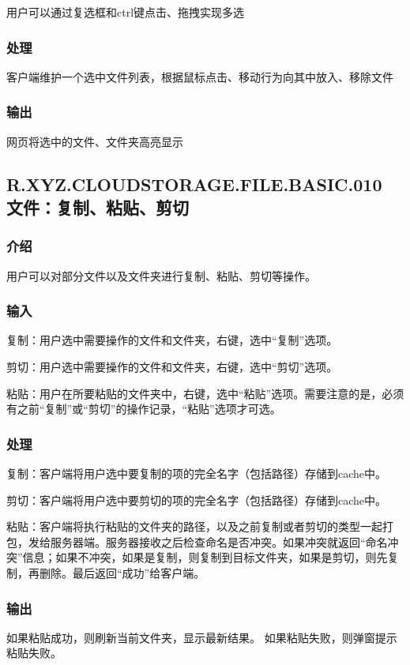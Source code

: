 用户可以通过复选框和ctrl键点击、拖拽实现多选

\subsubsection{处理}

客户端维护一个选中文件列表，根据鼠标点击、移动行为向其中放入、移除文件

\subsubsection{输出}

网页将选中的文件、文件夹高亮显示



\subsection{R.XYZ.CLOUDSTORAGE.FILE.BASIC.010 文件：复制、粘贴、剪切}

\subsubsection{介绍} 
用户可以对部分文件以及文件夹进行复制、粘贴、剪切等操作。

\subsubsection{输入} 
复制：用户选中需要操作的文件和文件夹，右键，选中“复制”选项。

剪切：用户选中需要操作的文件和文件夹，右键，选中“剪切”选项。

粘贴：用户在所要粘贴的文件夹中，右键，选中“粘贴”选项。需要注意的是，必须有之前“复制”或“剪切”的操作记录，“粘贴”选项才可选。

\subsubsection{处理}
复制：客户端将用户选中要复制的项的完全名字（包括路径）存储到cache中。

剪切：客户端将用户选中要剪切的项的完全名字（包括路径）存储到cache中。

粘贴：客户端将执行粘贴的文件夹的路径，以及之前复制或者剪切的类型一起打包，发给服务器端。服务器接收之后检查命名是否冲突。如果冲突就返回“命名冲突”信息；如果不冲突，如果是复制，则复制到目标文件夹，如果是剪切，则先复制，再删除。最后返回“成功”给客户端。

\subsubsection{输出}
如果粘贴成功，则刷新当前文件夹，显示最新结果。
如果粘贴失败，则弹窗提示粘贴失败。



